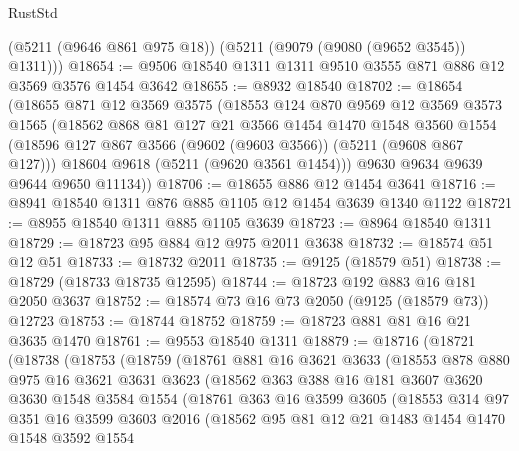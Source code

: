 \begin{lexlean}{RustStd}
\begin{coremodule}
      (@5211 (@9646 @861 @975 @18))
      (@5211 (@9079 (@9080 (@9652 @3545)) @1311)))
@18654 := @9506 @18540 @1311 @1311 @9510 @3555 @871 @886 @12 @3569 @3576 @1454 @3642
@18655 := @8932 @18540
@18702 := @18654
    (@18655
      @871
      @12
      @3569
      @3575
      (@18553
        @124
        @870
        @9569
        @12
        @3569
        @3573
        @1565
        (@18562
          @868
          @81
          @127
          @21
          @3566
          @1454
          @1470
          @1548
          @3560
          @1554
          (@18596 @127 @867 @3566 (@9602 (@9603 @3566)) (@5211 (@9608 @867 @127)))
          @18604
          @9618
          (@5211 (@9620 @3561 @1454)))
        @9630
        @9634
        @9639
        @9644
        @9650
        @11134))
@18706 := @18655 @886 @12 @1454 @3641
@18716 := @8941 @18540 @1311 @876 @885 @1105 @12 @1454 @3639 @1340 @1122
@18721 := @8955 @18540 @1311 @885 @1105 @3639
@18723 := @8964 @18540 @1311
@18729 := @18723 @95 @884 @12 @975 @2011 @3638
@18732 := @18574 @51 @12 @51
@18733 := @18732 @2011
@18735 := @9125 (@18579 @51)
@18738 := @18729 (@18733 @18735 @12595)
@18744 := @18723 @192 @883 @16 @181 @2050 @3637
@18752 := @18574 @73 @16 @73 @2050 (@9125 (@18579 @73)) @12723
@18753 := @18744 @18752
@18759 := @18723 @881 @81 @16 @21 @3635 @1470
@18761 := @9553 @18540 @1311
@18879 := @18716
    (@18721
      (@18738
        (@18753
          (@18759
            (@18761
              @881
              @16
              @3621
              @3633
              (@18553
                @878
                @880
                @975
                @16
                @3621
                @3631
                @3623
                (@18562
                  @363
                  @388
                  @16
                  @181
                  @3607
                  @3620
                  @3630
                  @1548
                  @3584
                  @1554
                  (@18761
                    @363
                    @16
                    @3599
                    @3605
                    (@18553
                      @314
                      @97
                      @351
                      @16
                      @3599
                      @3603
                      @2016
                      (@18562
                        @95
                        @81
                        @12
                        @21
                        @1483
                        @1454
                        @1470
                        @1548
                        @3592
                        @1554

\end{coremodule}
\end{lexlean}
